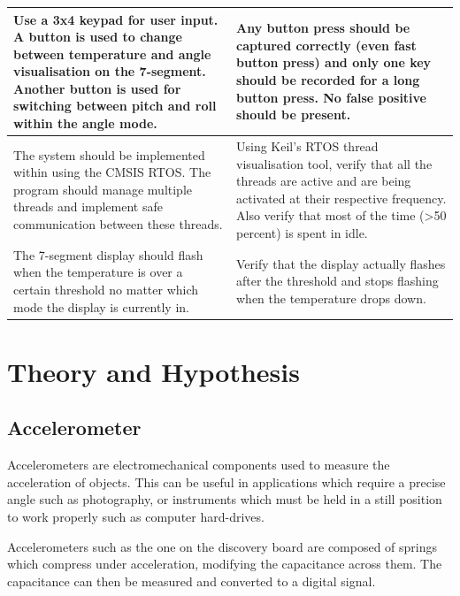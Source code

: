\documentclass[12pt]{article}
\begin{document}
\begin{table}[!h]
\begin{tabular}{|p{0.5\linewidth}|p{0.5\linewidth}|}
Use a 3x4 keypad for user input. A button is used to change between temperature and angle visualisation on the 7-segment. Another button is used for switching between pitch and roll within the angle mode.                                  & Any button press should be captured correctly (even fast button press) and only one key should be recorded for a long button press. No false positive should be present.                                                 \\ \hline
The system should be implemented within using the CMSIS RTOS. The program should manage multiple threads and implement safe communication between these threads.                                                                              & Using Keil's RTOS thread visualisation tool, verify that all the threads are active and are being activated at their respective frequency. Also verify that most of the time (\textgreater 50 percent) is spent in idle. \\ \hline
The 7-segment display should flash when the temperature is over a certain threshold no matter which mode the display is currently in.                                                                                                         & Verify that the display actually flashes after the threshold and stops flashing when the temperature drops down.                                                                                                         \\ \hline
\end{tabular}
\end{table}


\section{Theory and Hypothesis}
\subsection{Accelerometer}
Accelerometers are electromechanical components used to measure the acceleration of objects. This can be useful in applications which require a precise angle such as photography, or instruments which must be held in a still position to work properly such as computer hard-drives.

Accelerometers such as the one on the discovery board are composed of springs which compress under acceleration, modifying the capacitance across them. The capacitance can then be measured and converted to a digital signal.
\end{document}

